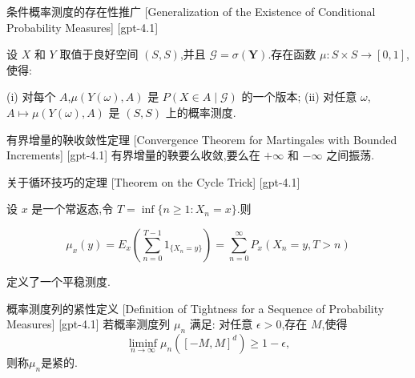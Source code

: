 \documentclass[UTF8]{ctexart}
\begin{document}
    
    
    \begin{thm}
        {条件概率测度的存在性推广}
        [Generalization of the Existence of Conditional Probability Measures]
        [gpt-4.1]
        
设 $X$ 和 $Y$ 取值于良好空间 $(S, S)$,并且 $\mathcal{G} = \sigma(\boldsymbol{Y})$.存在函数 $\mu : S \times S \to [0, 1]$,使得:

(i) 对每个 $A$,$\mu(Y(\omega), A)$ 是 $P(X \in A \mid \mathcal{G})$ 的一个版本;
(ii) 对任意 $\omega$,$A \mapsto \mu(Y(\omega), A)$ 是 $(S, S)$ 上的概率测度.

    \end{thm}
    
    
    
    \begin{thm}
        {有界增量的鞅收敛性定理}
        [Convergence Theorem for Martingales with Bounded Increments]
        [gpt-4.1]
        有界增量的鞅要么收敛,要么在 $+\infty$ 和 $-\infty$ 之间振荡.
    \end{thm}
    
    
    
    \begin{thm}
        {关于循环技巧的定理}
        [Theorem on the Cycle Trick]
        [gpt-4.1]
        
设 $x$ 是一个常返态,令 $T = \inf\{ n \geq 1 : X_{n} = x \}$.则

\[
\mu_{x}(y) = E_{x} \left( \sum_{n=0}^{T-1} 1_{\{ X_{n} = y \}} \right) = \sum_{n=0}^{\infty} P_{x}(X_{n} = y, T > n)
\]

定义了一个平稳测度.

    \end{thm}
    
    
    
    \begin{dfn}
        {概率测度列的紧性定义}
        [Definition of Tightness for a Sequence of Probability Measures]
        [gpt-4.1]
        若概率测度列 $\mu_n$ 满足: 对任意 $\epsilon > 0$,存在 $M$,使得
\[
\liminf_{n \to \infty} \mu_n([ - M , M ]^d) \geq 1 - \epsilon,
\]
则称$\mu_n$是紧的.
    \end{dfn}
    
    
    
\end{document}

